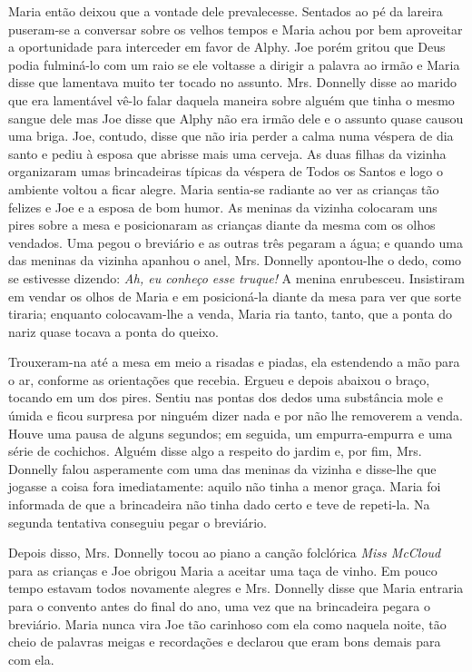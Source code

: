 Maria então deixou que a vontade dele prevalecesse. Sentados ao pé da
lareira puseram-se a conversar sobre os velhos tempos e Maria achou
por bem aproveitar a oportunidade para interceder
em favor de Alphy. Joe porém gritou que Deus podia fulminá-lo com um
raio se ele voltasse a dirigir a palavra ao irmão e Maria disse que
lamentava muito ter tocado no assunto. Mrs. Donnelly disse ao marido
que era lamentável vê-lo falar daquela maneira sobre alguém que tinha
o mesmo sangue dele mas Joe disse que Alphy não era irmão dele e o
assunto quase causou uma briga. Joe, contudo, disse que não iria
perder a calma numa véspera de dia santo e pediu à esposa que abrisse
mais uma cerveja. As duas filhas da vizinha organizaram umas
brincadeiras típicas da véspera de Todos os Santos e logo o ambiente
voltou a ficar alegre. Maria sentia-se radiante ao ver as crianças tão
felizes e Joe e a esposa de bom humor. As meninas da vizinha colocaram
uns pires sobre a mesa e posicionaram as crianças diante da mesma com
os olhos vendados. Uma pegou o breviário e as outras três pegaram a
água; e quando uma das meninas da vizinha apanhou o anel, Mrs.
Donnelly apontou-lhe o dedo, como se estivesse dizendo: \textit{Ah, eu conheço
esse truque!} A menina enrubesceu. Insistiram em vendar os olhos de
Maria e em posicioná-la diante da mesa para ver que sorte tiraria;
enquanto colocavam-lhe a venda, Maria ria tanto, tanto, que a ponta
do nariz quase tocava a ponta do queixo.

Trouxeram-na até a mesa em meio a risadas e piadas, ela estendendo a
mão para o ar, conforme as orientações que recebia. Ergueu e depois
abaixou o braço, tocando em um dos pires. Sentiu nas pontas dos dedos
uma substância mole e úmida e ficou surpresa por ninguém dizer nada e
por não lhe removerem a venda. Houve uma pausa de alguns segundos; em
seguida, um empurra-empurra e uma série de cochichos. Alguém disse
algo a respeito do jardim e, por fim, Mrs. Donnelly falou asperamente
com uma das meninas da vizinha e disse-lhe que jogasse a coisa fora
imediatamente: aquilo não tinha a menor graça. Maria foi informada de
que a brincadeira não tinha dado certo e teve de repeti-la. Na segunda
tentativa conseguiu pegar o breviário.

Depois disso, Mrs. Donnelly tocou ao piano a canção folclórica
\textit{Miss McCloud} para as crianças e Joe obrigou Maria a aceitar uma taça de
vinho. Em pouco tempo estavam todos novamente alegres e Mrs. Donnelly
disse que Maria entraria para o convento antes
do final do ano, uma vez que na brincadeira pegara o breviário. Maria
nunca vira Joe tão carinhoso com ela como naquela noite, tão cheio de
palavras meigas e recordações e declarou que eram bons demais para com
ela.

